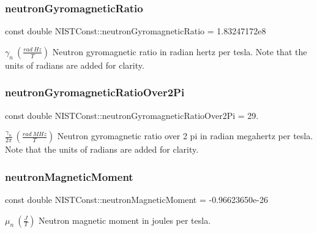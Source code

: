 \subsubsection{\texorpdfstring{neutron\+Gyromagnetic\+Ratio}{neutronGyromagneticRatio}}
{\footnotesize\ttfamily const double N\+I\+S\+T\+Const\+::neutron\+Gyromagnetic\+Ratio = 1.\+83247172e8}

$\gamma_n \ (\frac{rad\ Hz}{T})$ Neutron gyromagnetic ratio in radian hertz per tesla. Note that the units of radians are added for clarity. \mbox{\label{group___n_i_s_t_const-_neutron_ga66ce4219c0fa9d7e9050e5bef3cb743c}} 
\subsubsection{\texorpdfstring{neutron\+Gyromagnetic\+Ratio\+Over2\+Pi}{neutronGyromagneticRatioOver2Pi}}
{\footnotesize\ttfamily const double N\+I\+S\+T\+Const\+::neutron\+Gyromagnetic\+Ratio\+Over2\+Pi = 29.}

$\frac{\gamma_n}{2\pi} \ (\frac{rad\ MHz}{T})$ Neutron gyromagnetic ratio over 2 pi in radian megahertz per tesla. Note that the units of radians are added for clarity. \mbox{\label{group___n_i_s_t_const-_neutron_ga42a101bcaf7105edbfd6c06de9633d22}} 
\subsubsection{\texorpdfstring{neutron\+Magnetic\+Moment}{neutronMagneticMoment}}
{\footnotesize\ttfamily const double N\+I\+S\+T\+Const\+::neutron\+Magnetic\+Moment = -\/0.\+96623650e-\/26}

$\mu_n \ (\frac{J}{T})$ Neutron magnetic moment in joules per tesla. \mbox{\label{group___n_i_s_t_const-_neutron_ga01b6142f2d5dd4cd6ff10d2938a312cf}} 
